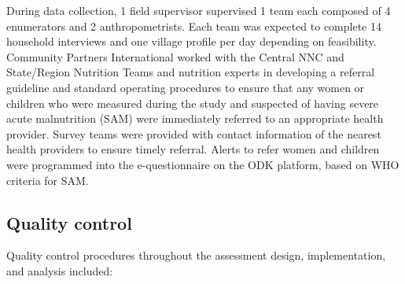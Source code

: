 \documentclass[12pt,a4paper]{article}
\begin{document}
During data collection, 1 field supervisor supervised 1 team each composed of 4 enumerators and 2 anthropometrists. Each team was expected to complete 14 household interviews and one village profile per day depending on feasibility. Community Partners International worked with the Central NNC and State/Region Nutrition Teams and nutrition experts in developing a referral guideline and standard operating procedures to ensure that any women or children who were measured during the study and suspected of having severe acute malnutrition (SAM) were immediately referred to an appropriate health provider. Survey teams were provided with contact information of the nearest health providers to ensure timely referral. Alerts to refer women and children were programmed into the e-questionnaire on the ODK platform, based on WHO criteria for SAM.

\hypertarget{quality-control}{%
\subsection{Quality control}\label{quality-control}}

Quality control procedures throughout the assessment design, implementation, and analysis included:
\end{document}
